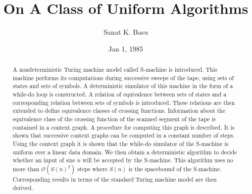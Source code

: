 \documentclass{article}
\title{On A Class of Uniform Algorithms}
\author{Sanat K. Basu}
\date{Jan 1, 1985}
\begin{document}
\newcommand\cell[1]{\mathrm{cell}\left(#1\right)}
\newcommand\cellp[1]{\mathrm{cell}'\left(#1\right)}
\newcommand\bigO[1]{$\mathcal{O}(#1)$}
\newcommand\Mcell[2]{$\,\substack{#1\\#2}\,$}
\newcommand\cancelb{\cancel{b}}
\newcommand\cancelc{\cancel{c}}
\newcommand{\suchthat}{\ni}
\newenvironment{aside}
{\begin{mdframed}[leftline=false, rightline=false, leftmargin=2em, rightmargin=2em,
    innerleftmargin=0pt, innerrightmargin=0pt, linewidth=0.75pt,skipabove=7pt, skipbelow=7pt]\small}
{\end{mdframed}}

\newenvironment{error}
{\begin{mdframed}[backgroundcolor=red!10, leftline=false, rightline=false, leftmargin=2em, rightmargin=2em,
    innerleftmargin=0pt, innerrightmargin=0pt, linewidth=0.75pt,skipabove=7pt, skipbelow=7pt]\small}
{\end{mdframed}}

\newtheorem{theorem}{Theorem}
\newtheorem{lemma}[theorem]{Lemma}

\maketitle
\begin{abstract}
A nondeterministic Turing machine model called S-machine is introduced.
This machine performs its computations during successive sweeps of the tape, using sets of states and sets of symbols.
A deterministic simulator of this machine in the form of a while-do loop is constructed.
A relation of equivalence between sets of states and a corresponding relation between sets of symbols is introduced.
These relations are then extended to define equivalence classes of crossing functions.
Information about the equivalence class of the crossing function of the scanned segment of the tape is contained
in a context graph.
A procedure for computing this graph is described.
It is shown that successive context graphs can be computed in a constant number of 
steps.
Using the context graph it is shown that the while-do simulator of the S-machine
is uniform over a linear data domain.
We then obtain a deterministic algorithm to
decide whether an input of size $n$ will be accepted by the S-machine.
This algorithm uses no more than \bigO{S(n)^2} steps where $S(n)$ is the spacebound
of the S-machine.
Corresponding results in terms of the standard Turing machine model are then derived.
\end{abstract}
\end{document}
